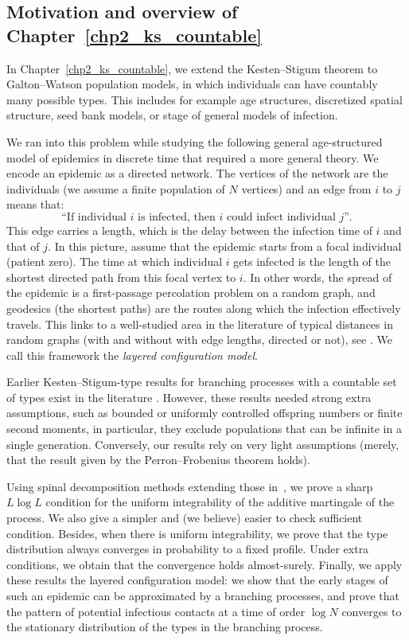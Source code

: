 \subsection{Motivation and overview of Chapter~\ref{chp2_ks_countable}}
In Chapter~\ref{chp2_ks_countable}, we extend the Kesten--Stigum theorem to Galton--Watson population models, in which individuals can have countably many possible types. This includes for example age structures, discretized spatial structure, seed bank models, or stage of general models of infection.

We ran into this problem while studying the following general age-structured model of epidemics in discrete time that required a more general theory. We encode an epidemic as a directed network. The vertices of the network are the individuals (we assume a finite population of $N$ vertices) and an edge from $i$ to $j$ means that:
\[
\text{``If individual $i$ is infected, then $i$ could infect individual $j$''.}
\]
 This edge carries a length, which is the delay between the infection time of $i$ and that of $j$. 
 In this picture, assume that the epidemic starts from a focal individual (patient zero). The time at which individual $i$ gets infected is the length of the shortest directed path from this focal vertex to $i$. In other words, the spread of the epidemic is a first-passage percolation problem on a random graph, and geodesics (the shortest paths) are the routes along which the infection effectively travels.
This links to a well-studied area in the literature of typical distances in random graphs (with and without with edge lengths, directed or not), see \cite{bhamidi_front_2014,vO18}.
We call this framework the \emph{layered configuration model}.

\medskip 

Earlier Kesten--Stigum-type results for branching processes with a countable set of types exist in the literature \citep{asmussen_strong_1976, moy_extensions_1967, BBC25}. However, these results needed strong extra assumptions, such as bounded or uniformly controlled offspring numbers or finite second moments, in particular, they exclude populations that can be infinite in a single generation. Conversely, our results rely on very light assumptions (merely, that the result given by the Perron--Frobenius theorem holds).

Using spinal decomposition methods extending those in~\cite{lyons_pemantle_peres_1995,kurtz_conceptual_1997}, 
we prove a sharp $L\log L$ condition for the uniform integrability of the additive martingale of the process. We also give a simpler and (we believe) easier to check sufficient condition. 
Besides, when there is uniform integrability, we prove that the type distribution always converges in probability to a fixed profile. Under extra conditions, we obtain that the convergence holds almost-surely. Finally, we apply these results the layered configuration model: we show that the early stages of such an epidemic can be approximated by a branching processes, and prove that the pattern of potential infectious contacts at a time of order $\log N$ converges to the stationary distribution of the types in the branching process.

